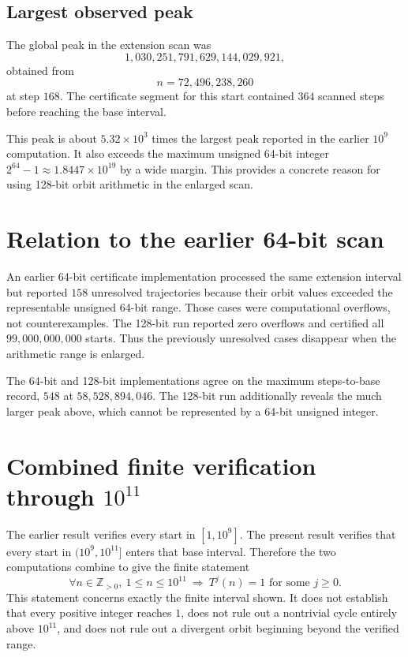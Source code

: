 \documentclass[11pt]{article}
\begin{document}
\subsection{Largest observed peak}
The global peak in the extension scan was
\[
\boxed{1,030,251,791,629,144,029,921},
\]
obtained from
\[
\boxed{n=72,496,238,260}
\]
at step $168$. The certificate segment for this start contained $364$ scanned steps before reaching the base interval.

This peak is about $5.32\times10^3$ times the largest peak reported in the earlier $10^9$ computation. It also exceeds the maximum unsigned 64-bit integer $2^{64}-1\approx1.8447\times10^{19}$ by a wide margin. This provides a concrete reason for using 128-bit orbit arithmetic in the enlarged scan.

\section{Relation to the earlier 64-bit scan}
An earlier 64-bit certificate implementation processed the same extension interval but reported $158$ unresolved trajectories because their orbit values exceeded the representable unsigned 64-bit range. Those cases were computational overflows, not counterexamples. The 128-bit run reported zero overflows and certified all $99,000,000,000$ starts. Thus the previously unresolved cases disappear when the arithmetic range is enlarged.

The 64-bit and 128-bit implementations agree on the maximum steps-to-base record, $548$ at $58,528,894,046$. The 128-bit run additionally reveals the much larger peak above, which cannot be represented by a 64-bit unsigned integer.

\section{Combined finite verification through $10^{11}$}
The earlier result verifies every start in $[1,10^9]$. The present result verifies that every start in $(10^9,10^{11}]$ enters that base interval. Therefore the two computations combine to give the finite statement
\begin{equation}
\boxed{\forall n\in\mathbb{Z}_{>0},\ 1\le n\le10^{11}\ \Longrightarrow\ T^j(n)=1\text{ for some }j\ge0.}
\end{equation}
This statement concerns exactly the finite interval shown. It does not establish that every positive integer reaches $1$, does not rule out a nontrivial cycle entirely above $10^{11}$, and does not rule out a divergent orbit beginning beyond the verified range.
\end{document}
